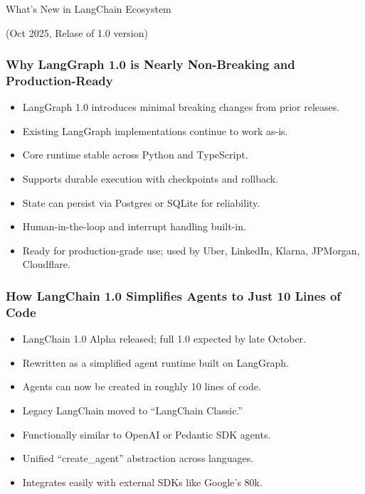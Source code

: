 \begin{frame}[fragile]\frametitle{}
\begin{center}
{\Large What's New in LangChain Ecosystem}

{\tiny (Oct 2025, Relase of 1.0 version)}

\end{center}
\end{frame}

\begin{frame}[fragile]\frametitle{Why LangGraph 1.0 is Nearly Non-Breaking and Production-Ready}
  \begin{itemize}
    \item LangGraph 1.0 introduces minimal breaking changes from prior releases.
    \item Existing LangGraph implementations continue to work as-is.
    \item Core runtime stable across Python and TypeScript.
    \item Supports durable execution with checkpoints and rollback.
    \item State can persist via Postgres or SQLite for reliability.
    \item Human-in-the-loop and interrupt handling built-in.
    \item Ready for production-grade use; used by Uber, LinkedIn, Klarna, JPMorgan, Cloudflare.
  \end{itemize}
\end{frame}

\begin{frame}[fragile]\frametitle{How LangChain 1.0 Simplifies Agents to Just 10 Lines of Code}
  \begin{itemize}
    \item LangChain 1.0 Alpha released; full 1.0 expected by late October.
    \item Rewritten as a simplified agent runtime built on LangGraph.
    \item Agents can now be created in roughly 10 lines of code.
    \item Legacy LangChain moved to “LangChain Classic.”
    \item Functionally similar to OpenAI or Pedantic SDK agents.
    \item Unified “create\_agent” abstraction across languages.
    \item Integrates easily with external SDKs like Google’s 80k.
  \end{itemize}
\end{frame}


